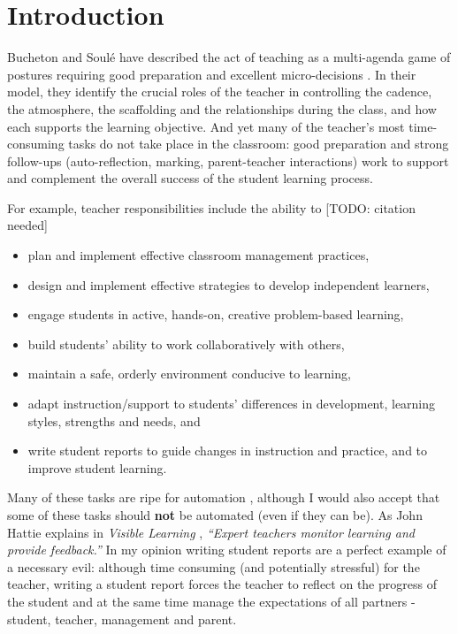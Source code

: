 \documentclass[10pt]{article}
\begin{document}
\tableofcontents



\section{Introduction}

Bucheton and Soulé have described the act of teaching as a multi-agenda game of postures requiring good preparation and excellent micro-decisions \cite{BS09}. In their model, they identify the crucial roles of the teacher in controlling the cadence, the atmosphere, the scaffolding and the relationships during the class, and how each supports the learning objective. And yet many of the teacher's most time-consuming tasks do not take place in the classroom: good preparation and strong follow-ups (auto-reflection, marking, parent-teacher interactions) work to support and complement the overall success of the student learning process.

For example, teacher responsibilities include the ability to [TODO: citation needed]
\begin{itemize}
\item plan and implement effective classroom management practices,
\item design and implement effective strategies to develop independent learners,
\item engage students in active, hands-on, creative problem-based learning,
\item build students’ ability to work collaboratively with others,
\item maintain a safe, orderly environment conducive to learning,
\item adapt instruction/support to students’ differences in development, learning styles, strengths and needs, and
\item write student reports to guide changes in instruction and practice, and to improve student learning.
\end{itemize}

Many of these tasks are ripe for automation \cite{Swei15}, although I would also accept that some of these tasks should \textbf{not} be automated (even if they can be). As John Hattie explains in \emph{Visible Learning} \cite{Hat12}, \emph{``Expert teachers monitor learning and provide feedback.''} In my opinion writing student reports are a perfect example of a necessary evil: although time consuming (and potentially stressful) for the teacher, writing a student report forces the teacher to reflect on the progress of the student and at the same time manage the expectations of all partners - student, teacher, management and parent.
\end{document}
